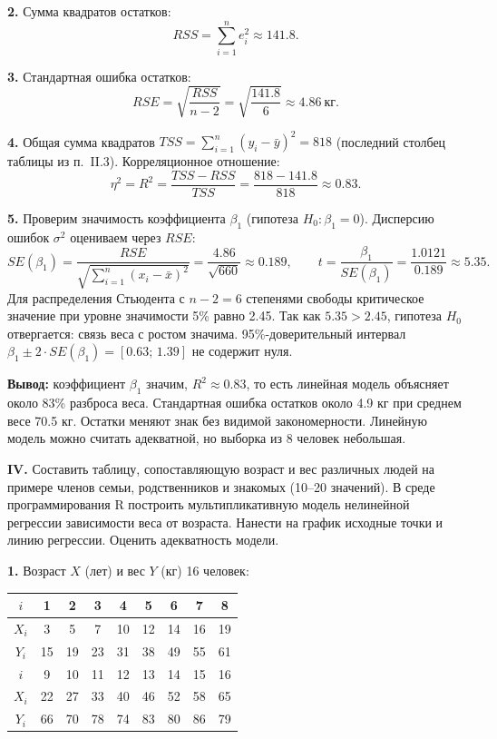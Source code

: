 \documentclass{article}
\begin{document}
    \textbf{2.} Сумма квадратов остатков:
    \[RSS=\sum_{i=1}^{n}e_i^2\approx141.8.\]

    \textbf{3.} Стандартная ошибка остатков:
    \[RSE=\sqrt{\frac{RSS}{n-2}}=\sqrt{\frac{141.8}{6}}\approx4.86\ \text{кг}.\]

    \textbf{4.} Общая сумма квадратов $TSS=\sum_{i=1}^{n}(y_i-\bar y)^2=818$ (последний столбец таблицы из п.~II.3). Корреляционное отношение:
    \[\eta^2=R^2=\frac{TSS-RSS}{TSS}=\frac{818-141.8}{818}\approx0.83.\]

    \textbf{5.} Проверим значимость коэффициента $\beta_1$ (гипотеза $H_0:\beta_1=0$). Дисперсию ошибок $\sigma^2$ оцениваем через $RSE$:
    \[SE(\beta_1)=\frac{RSE}{\sqrt{\sum_{i=1}^{n}(x_i-\bar x)^2}}=\frac{4.86}{\sqrt{660}}\approx0.189,\qquad t=\frac{\beta_1}{SE(\beta_1)}=\frac{1.0121}{0.189}\approx5.35.\]
    Для распределения Стьюдента с $n-2=6$ степенями свободы критическое значение при уровне значимости 5\% равно 2.45. Так как $5.35>2.45$, гипотеза $H_0$ отвергается: связь веса с ростом значима. 95\%-доверительный интервал $\beta_1\pm2\cdot SE(\beta_1)=[0.63;\,1.39]$ не содержит нуля.

    \textbf{Вывод:} коэффициент $\beta_1$ значим, $R^2\approx0.83$, то есть линейная модель объясняет около 83\% разброса веса. Стандартная ошибка остатков около 4.9 кг при среднем весе 70.5 кг. Остатки меняют знак без видимой закономерности. Линейную модель можно считать адекватной, но выборка из 8 человек небольшая.

\begin{framed}
    \textbf{IV.} Составить таблицу, сопоставляющую возраст и вес различных людей на примере
    членов семьи, родственников и знакомых (10--20 значений). В среде программирования R построить
    мультипликативную модель нелинейной регрессии зависимости веса от возраста. Нанести на график
    исходные точки и линию регрессии. Оценить адекватность модели.
\end{framed}
    \textbf{1.} Возраст $X$ (лет) и вес $Y$ (кг) 16 человек:
    \begin{center}
    \begin{tabular}{|c|c|c|c|c|c|c|c|c|}
        \hline
        $i$ & 1 & 2 & 3 & 4 & 5 & 6 & 7 & 8 \\ \hline
        $X_i$ & 3 & 5 & 7 & 10 & 12 & 14 & 16 & 19 \\ \hline
        $Y_i$ & 15 & 19 & 23 & 31 & 38 & 49 & 55 & 61 \\ \hline\hline
        $i$ & 9 & 10 & 11 & 12 & 13 & 14 & 15 & 16 \\ \hline
        $X_i$ & 22 & 27 & 33 & 40 & 46 & 52 & 58 & 65 \\ \hline
        $Y_i$ & 66 & 70 & 78 & 74 & 83 & 80 & 86 & 79 \\ \hline
    \end{tabular}
    \end{center}
\end{document}
